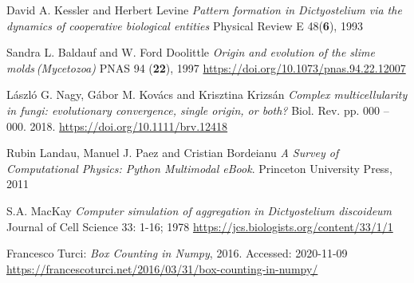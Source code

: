 \documentclass[a4paper,12pt]{article}
\begin{document}
\begin{thebibliography}{1}

 David A. Kessler and Herbert Levine \emph{Pattern formation in Dictyostelium via the dynamics of cooperative biological entities} Physical Review E 48(\textbf{6}), 1993

 Sandra L. Baldauf and W. Ford Doolittle \emph{Origin and evolution of the slime molds (Mycetozoa)} PNAS 94 (\textbf{22}), 1997 \url{https://doi.org/10.1073/pnas.94.22.12007}

 László G. Nagy, Gábor M. Kovács and Krisztina Krizsán \emph{Complex multicellularity in fungi: evolutionary convergence, single origin, or both?} Biol. Rev. pp. 000 – 000. 2018. \url{https://doi.org/10.1111/brv.12418}

 Rubin Landau, Manuel J. Paez and Cristian Bordeianu \emph{A Survey of Computational Physics: Python Multimodal eBook}. Princeton University Press, 2011

 S.A. MacKay \emph{Computer simulation of aggregation in Dictyostelium discoideum} Journal of Cell Science 33: 1-16; 1978 \url{https://jcs.biologists.org/content/33/1/1}

 Francesco Turci: \emph{Box Counting in Numpy}, 2016. Accessed: 2020-11-09 \url{https://francescoturci.net/2016/03/31/box-counting-in-numpy/}

\end{thebibliography}
\end{document}
